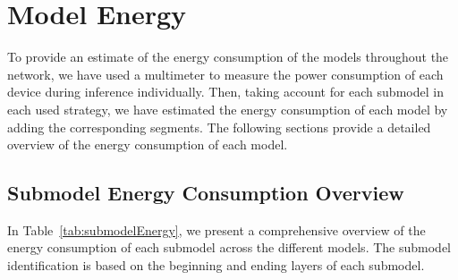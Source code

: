 \chapter{Model Energy} \label{ap2:modelEnergy}

To provide an estimate of the energy consumption of the models throughout the network,
we have used a multimeter to measure the power consumption of each device during
inference individually. Then, taking account for each submodel in each used strategy,
we have estimated the energy consumption of each model by adding the corresponding
segments. The following sections provide a detailed overview of the energy consumption
of each model.

\section{Submodel Energy Consumption Overview}

In Table~\ref{tab:submodelEnergy}, we present a comprehensive overview of the energy
consumption of each submodel across the different models. The submodel identification
is based on the beginning and ending layers of each submodel.

